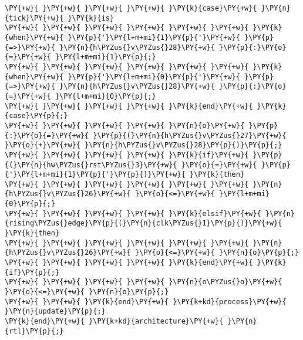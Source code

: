 \begin{Verbatim}[commandchars=\\\{\}]
\PY{+w}{ }\PY{+w}{ }\PY{+w}{ }\PY{+w}{ }\PY{k}{case}\PY{+w}{ }\PY{n}{tick}\PY{+w}{ }\PY{k}{is}
\PY{+w}{ }\PY{+w}{ }\PY{+w}{ }\PY{+w}{ }\PY{+w}{ }\PY{+w}{ }\PY{k}{when}\PY{+w}{ }\PY{p}{'}\PY{l+m+mi}{1}\PY{p}{'}\PY{+w}{ }\PY{p}{=>}\PY{+w}{ }\PY{n}{h\PYZus{}v\PYZus{}28}\PY{+w}{ }\PY{p}{:}\PY{o}{=}\PY{+w}{ }\PY{l+m+mi}{1}\PY{p}{;}
\PY{+w}{ }\PY{+w}{ }\PY{+w}{ }\PY{+w}{ }\PY{+w}{ }\PY{+w}{ }\PY{k}{when}\PY{+w}{ }\PY{p}{'}\PY{l+m+mi}{0}\PY{p}{'}\PY{+w}{ }\PY{p}{=>}\PY{+w}{ }\PY{n}{h\PYZus{}v\PYZus{}28}\PY{+w}{ }\PY{p}{:}\PY{o}{=}\PY{+w}{ }\PY{l+m+mi}{0}\PY{p}{;}
\PY{+w}{ }\PY{+w}{ }\PY{+w}{ }\PY{+w}{ }\PY{k}{end}\PY{+w}{ }\PY{k}{case}\PY{p}{;}
\PY{+w}{ }\PY{+w}{ }\PY{+w}{ }\PY{+w}{ }\PY{n}{o}\PY{+w}{ }\PY{p}{:}\PY{o}{=}\PY{+w}{ }\PY{p}{(}\PY{n}{h\PYZus{}v\PYZus{}27}\PY{+w}{ }\PY{o}{+}\PY{+w}{ }\PY{n}{h\PYZus{}v\PYZus{}28}\PY{p}{)}\PY{p}{;}
\PY{+w}{ }\PY{+w}{ }\PY{+w}{ }\PY{+w}{ }\PY{k}{if}\PY{+w}{ }\PY{p}{(}\PY{n}{hw\PYZus{}rst\PYZus{}3}\PY{+w}{ }\PY{o}{=}\PY{+w}{ }\PY{p}{'}\PY{l+m+mi}{1}\PY{p}{'}\PY{p}{)}\PY{+w}{ }\PY{k}{then}
\PY{+w}{ }\PY{+w}{ }\PY{+w}{ }\PY{+w}{ }\PY{+w}{ }\PY{+w}{ }\PY{n}{h\PYZus{}v\PYZus{}26}\PY{+w}{ }\PY{o}{<=}\PY{+w}{ }\PY{l+m+mi}{0}\PY{p}{;}
\PY{+w}{ }\PY{+w}{ }\PY{+w}{ }\PY{+w}{ }\PY{k}{elsif}\PY{+w}{ }\PY{n}{rising\PYZus{}edge}\PY{p}{(}\PY{n}{clk\PYZus{}1}\PY{p}{)}\PY{+w}{ }\PY{k}{then}
\PY{+w}{ }\PY{+w}{ }\PY{+w}{ }\PY{+w}{ }\PY{+w}{ }\PY{+w}{ }\PY{n}{h\PYZus{}v\PYZus{}26}\PY{+w}{ }\PY{o}{<=}\PY{+w}{ }\PY{n}{o}\PY{p}{;}
\PY{+w}{ }\PY{+w}{ }\PY{+w}{ }\PY{+w}{ }\PY{k}{end}\PY{+w}{ }\PY{k}{if}\PY{p}{;}
\PY{+w}{ }\PY{+w}{ }\PY{+w}{ }\PY{+w}{ }\PY{n}{o\PYZus{}o}\PY{+w}{ }\PY{o}{<=}\PY{+w}{ }\PY{n}{o}\PY{p}{;}
\PY{+w}{ }\PY{+w}{ }\PY{k}{end}\PY{+w}{ }\PY{k+kd}{process}\PY{+w}{ }\PY{n}{update}\PY{p}{;}
\PY{k}{end}\PY{+w}{ }\PY{k+kd}{architecture}\PY{+w}{ }\PY{n}{rtl}\PY{p}{;}
\end{Verbatim}
